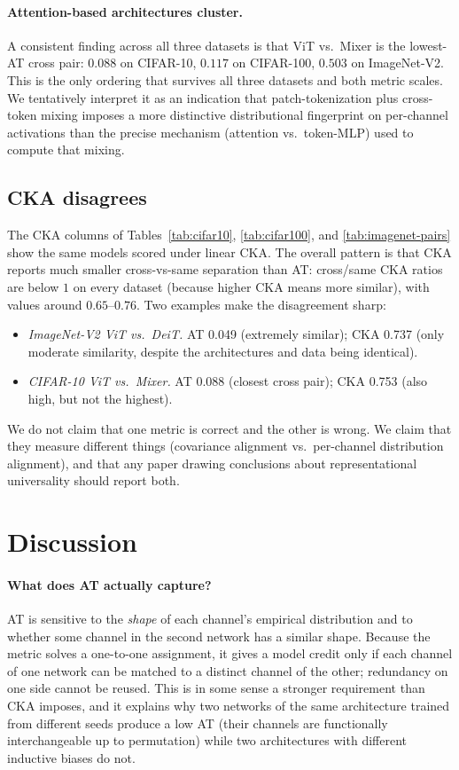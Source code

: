 \documentclass[11pt]{article}
\begin{document}
\paragraph{Attention-based architectures cluster.} A consistent finding
across all three datasets is that ViT vs.\ Mixer is the lowest-AT cross
pair: $0.088$ on CIFAR-10, $0.117$ on CIFAR-100, $0.503$ on ImageNet-V2.
This is the only ordering that survives all three datasets and both
metric scales. We tentatively interpret it as an indication that
patch-tokenization plus cross-token mixing imposes a more
distinctive distributional fingerprint on per-channel activations than
the precise mechanism (attention vs.\ token-MLP) used to compute that
mixing.

\subsection{CKA disagrees}

The CKA columns of Tables~\ref{tab:cifar10}, \ref{tab:cifar100}, and
\ref{tab:imagenet-pairs} show the same models scored under
linear CKA. The overall pattern is that CKA reports much smaller
cross-vs-same separation than AT: cross/same CKA ratios are below
$1$ on every dataset (because higher CKA means more similar), with
values around $0.65$--$0.76$. Two examples make the disagreement
sharp:
\begin{itemize}
\item \emph{ImageNet-V2 ViT vs.\ DeiT.} AT 0.049 (extremely similar);
CKA 0.737 (only moderate similarity, despite the architectures and
data being identical).
\item \emph{CIFAR-10 ViT vs.\ Mixer.} AT 0.088 (closest cross pair);
CKA 0.753 (also high, but not the highest).
\end{itemize}
We do not claim that one metric is correct and the other is wrong. We
claim that they measure different things (covariance alignment vs.\
per-channel distribution alignment), and that any paper drawing
conclusions about representational universality should report both.

\section{Discussion}

\paragraph{What does AT actually capture?} AT is sensitive to the
\emph{shape} of each channel's empirical distribution and to whether
some channel in the second network has a similar shape. Because the
metric solves a one-to-one assignment, it gives a model credit only if
each channel of one network can be matched to a distinct channel of
the other; redundancy on one side cannot be reused. This is in some
sense a stronger requirement than CKA imposes, and it explains why
two networks of the same architecture trained from different seeds
produce a low AT (their channels are functionally interchangeable up to
permutation) while two architectures with different inductive biases
do not.
\end{document}
